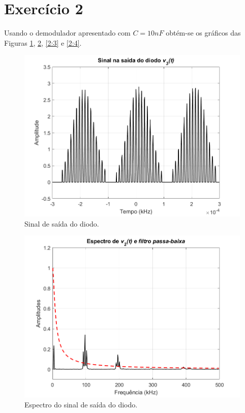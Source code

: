 \documentclass[a4paper,12pt,oneside,openany,table,xcdraw]{article}
\begin{document}
\section{Exercício 2}
Usando o demodulador apresentado com $C=10nF$ obtém-se os gráficos das Figuras \ref{2:1}, \ref{2:2}, \ref{2:3} e  \ref{2:4}.

\vspace{0.3cm}
\begin{figure}[H]
\centering
\includegraphics[width=\textwidth]{ex2_diodo}
\caption{Sinal de saída do diodo.}
\label{2:1}
\end{figure}

\vspace{0.3cm}
\begin{figure}[H]
\centering
\includegraphics[width=\textwidth]{ex2_espectro_diodo}
\caption{Espectro do sinal de saída do diodo.}
\label{2:2}
\end{figure}
\end{document}
